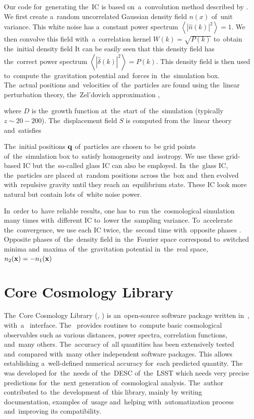 Our code for~generating the~IC is based on~a~convolution method described by \textcite{1997ApJ...490L.127P}. We first create a~random uncorrelated Gaussian density field $n(x)$ of~unit variance. This white noise has a~constant power spectrum $\left\langle|\hat n(k)|^2\right\rangle=1$. We then convolve this field with~a~correlation kernel $W(k)=\sqrt{P(k)}$ to~obtain the~initial  density field
It can be easily seen that this density field has the~correct power spectrum $\left\langle|\hat\delta(k)|^2\right\rangle=P(k)$. This density field is then used to~compute the~gravitation potential and~forces in~the~simulation box. The~actual positions and~velocities of~the~particles are found using the~linear perturbation theory, the~Zel'dovich approximation \parencite{1970A&A.....5...84Z},
\begin{sloppypar}
where $D$ is the~growth function at~the~start of~the~simulation (typically ${z\sim20-200}$). The~displacement field $S$ is computed from the~linear theory and~satisfies
\end{sloppypar}
The~initial positions $\mathbf q$ of~particles are chosen to~be grid points of~the~simulation box to~satisfy homogeneity and~isotropy. We use these grid-based IC but the~so-called glass IC can also be employed. In~the~glass IC, the~particles are placed at~random positions across the~box and~then evolved with~repulsive gravity until they reach an~equilibrium state. These IC look more natural but contain lots of~white noise power.

In~order to~have reliable results, one has to~run the~cosmological simulation many times with~different IC to~lower the~sampling variance. To~accelerate the~convergence, we use each IC twice, the~second time with~opposite phases \parencite{PhysRevD.93.103519}. Opposite phases of~the~density field in~the~Fourier space correspond to~switched minima and~maxima of~the~gravitation potential in~the~real space, $n_2(\mathbf x)=-n_1(\mathbf x)$

\section{Core Cosmology Library}
The~Core Cosmology Library (, \textcite{2019ApJS..242....2C}) is an~open-source software package written in~, with~a~ interface. The~ provides routines to~compute basic cosmological observables such as various distances, power spectra, correlation functions, and~many others. The~accuracy of~all quantities has been extensively tested and~compared with~many other independent software packages. This allows establishing a~well-defined numerical accuracy for~each predicted quantity. The~ was developed for~the~needs of~the~DESC of~the~LSST which needs very precise predictions for~the~next generation of~cosmological analysis. The~author contributed to~the~development of~this library, mainly by writing documentation, examples of~usage and~helping with~automatization process and~improving its compatibility.

